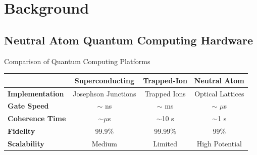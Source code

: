 \section{Background}



    
    

\subsection{Neutral Atom Quantum Computing Hardware}
\begin{frame}{Comparison of Quantum Computing Platforms}

\small %
\begin{table}[h!]
\centering
\begin{tabular}{lccc}
\toprule
 & \textbf{Superconducting} & \textbf{Trapped-Ion} & \textbf{Neutral Atom} \\
\midrule
\textbf{Implementation} & Josephson Junctions & Trapped Ions & Optical Lattices \\
\textbf{Gate Speed} & $\sim$ ns & $\sim$ ms & $\sim$ $\mu$s \\
\textbf{Coherence Time} & $\sim$$\mu$s & $\sim$10 s & $\sim$1 s \\
\textbf{Fidelity} & 99.9\% & 99.99\% & 99\% \\
\textbf{Scalability} & Medium & Limited & High Potential \\
\bottomrule
\end{tabular}
\end{table}

\end{frame}

